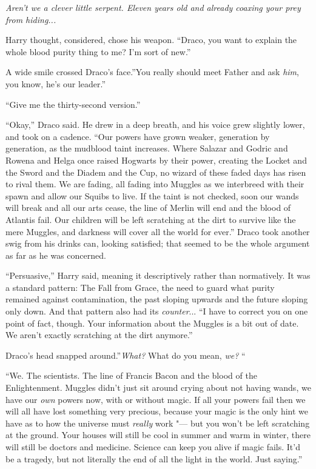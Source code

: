 \emph{Aren't we a clever little serpent. Eleven years old and already
coaxing your prey from hiding...}

Harry thought, considered, chose his weapon. ``Draco, you want to
explain the whole blood purity thing to me? I'm sort of new.''

A wide smile crossed Draco's face.''You really should meet Father and
ask \emph{him}, you know, he's our leader.''

``Give me the thirty-second version.''

``Okay,'' Draco said. He drew in a deep breath, and his voice grew
slightly lower, and took on a cadence. ``Our powers have grown weaker,
generation by generation, as the mudblood taint increases. Where Salazar
and Godric and Rowena and Helga once raised Hogwarts by their power,
creating the Locket and the Sword and the Diadem and the Cup, no wizard
of these faded days has risen to rival them. We are fading, all fading
into Muggles as we interbreed with their spawn and allow our Squibs to
live. If the taint is not checked, soon our wands will break and all our
arts cease, the line of Merlin will end and the blood of Atlantis fail.
Our children will be left scratching at the dirt to survive like the
mere Muggles, and darkness will cover all the world for ever.'' Draco
took another swig from his drinks can, looking satisfied; that seemed to
be the whole argument as far as he was concerned.

``Persuasive,'' Harry said, meaning it descriptively rather than
normatively. It was a standard pattern: The Fall from Grace, the need to
guard what purity remained against contamination, the past sloping
upwards and the future sloping only down. And that pattern also had its
\emph{counter}... ``I have to correct you on one point of fact,
though. Your information about the Muggles is a bit out of date. We
aren't exactly scratching at the dirt anymore.''

Draco's head snapped around.''\emph{What?} What do you mean, \emph{we?}
``

``We. The scientists. The line of Francis Bacon and the blood of the
Enlightenment. Muggles didn't just sit around crying about not having
wands, we have our \emph{own} powers now, with or without magic. If all
your powers fail then we will all have lost something very precious,
because your magic is the only hint we have as to how the universe must
\emph{really} work "--- but you won't be left scratching at the ground.
Your houses will still be cool in summer and warm in winter, there will
still be doctors and medicine. Science can keep you alive if magic
fails. It'd be a tragedy, but not literally the end of all the light in
the world. Just saying.''

